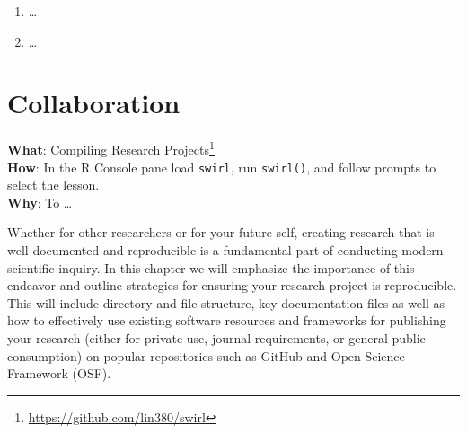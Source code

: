 \documentclass[
  letterpaper,
]{scrbook}
\providecommand{\tightlist}{%
  \setlength{\itemsep}{0pt}\setlength{\parskip}{0pt}}\usepackage{longtable,booktabs,array}
\DeclareRobustCommand{\href}[2]{#2\footnote{\url{#1}}}
\begin{document}
\begin{tcolorbox}[enhanced jigsaw, title=\textcolor{quarto-callout-note-color}{\faInfo}\hspace{0.5em}{Technical exercises}, titlerule=0mm, toptitle=1mm, colbacktitle=quarto-callout-note-color!10!white, bottomtitle=1mm, left=2mm, colframe=quarto-callout-note-color-frame, breakable, toprule=.15mm, colback=white, opacitybacktitle=0.6, leftrule=.75mm, rightrule=.15mm, bottomrule=.15mm, arc=.35mm, coltitle=black, opacityback=0]

\begin{enumerate}
\def\labelenumi{\arabic{enumi}.}
\tightlist
\item
  \ldots{}
\item
  \ldots{}
\end{enumerate}

\end{tcolorbox}

\hypertarget{sec-collaboration}{%
\chapter{Collaboration}\label{sec-collaboration}}

\begin{tcolorbox}[enhanced jigsaw, title=\textcolor{quarto-callout-tip-color}{\faLightbulb}\hspace{0.5em}{Swirl}, titlerule=0mm, toptitle=1mm, colbacktitle=quarto-callout-tip-color!10!white, bottomtitle=1mm, left=2mm, colframe=quarto-callout-tip-color-frame, breakable, toprule=.15mm, colback=white, opacitybacktitle=0.6, leftrule=.75mm, rightrule=.15mm, bottomrule=.15mm, arc=.35mm, coltitle=black, opacityback=0]

\textbf{What}: \href{https://github.com/lin380/swirl}{Compiling Research
Projects}\\
\textbf{How}: In the R Console pane load \texttt{swirl}, run
\texttt{swirl()}, and follow prompts to select the lesson.\\
\textbf{Why}: To \ldots{}

\end{tcolorbox}

Whether for other researchers or for your future self, creating research
that is well-documented and reproducible is a fundamental part of
conducting modern scientific inquiry. In this chapter we will emphasize
the importance of this endeavor and outline strategies for ensuring your
research project is reproducible. This will include directory and file
structure, key documentation files as well as how to effectively use
existing software resources and frameworks for publishing your research
(either for private use, journal requirements, or general public
consumption) on popular repositories such as GitHub and Open Science
Framework (OSF).
\end{document}
